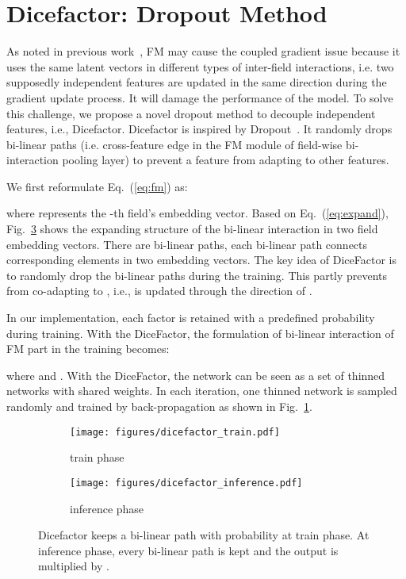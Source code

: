 \documentclass[sigconf]{acmart}
\begin{document}
\section{Dicefactor: Dropout Method}
As noted in previous work~\citep{qu2018product}, FM may cause the coupled gradient issue because it uses the same latent vectors in different types of inter-field interactions, i.e.  two supposedly independent features are updated in the same direction during the gradient update process. It will damage the performance of the model. To solve this challenge, we propose a novel dropout method to decouple independent features, i.e., Dicefactor. 
Dicefactor is inspired by Dropout~\citep{srivastava2014dropout}. It randomly drops bi-linear paths (i.e. cross-feature edge in the FM module of field-wise bi-interaction pooling layer) to prevent a feature from adapting to other features. 

We first reformulate Eq.~(\ref{eq:fm}) as:

where  represents the -th field's embedding vector. Based on Eq.~(\ref{eq:expand}), Fig.~\ref{fig::subfig} shows the expanding structure of the bi-linear interaction in two field embedding vectors. There are  bi-linear paths, each bi-linear path connects corresponding elements in two embedding vectors. The key idea of DiceFactor is to randomly drop the bi-linear paths during the training. This partly prevents  from co-adapting to , i.e.,  is updated through the direction of . 

In our implementation, each factor is retained with a predefined probability  during training. With the DiceFactor, the formulation of bi-linear interaction of FM part in the training becomes:

where  and . With the DiceFactor, the network can be seen as a set of  thinned networks with shared weights. In each iteration, one thinned network is sampled randomly and trained by back-propagation as shown in Fig.~\ref{fig::subfig::a}.

\begin{figure}[htbp]
\centering
  \begin{subfigure}{0.48\linewidth}
    \texttt{[image: figures/dicefactor\_train.pdf]}
    \caption{train phase}
    \label{fig::subfig::a}
  \end{subfigure}
  \begin{subfigure}{0.48\linewidth}
    \texttt{[image: figures/dicefactor\_inference.pdf]}
    \caption{inference phase}
    \label{fig::subfig::b}
  \end{subfigure}
  \caption{Dicefactor keeps a bi-linear path with probability  at train phase. At inference phase, every bi-linear path is kept and the output is multiplied by .}
  \label{fig::subfig}
\end{figure}
\end{document}

